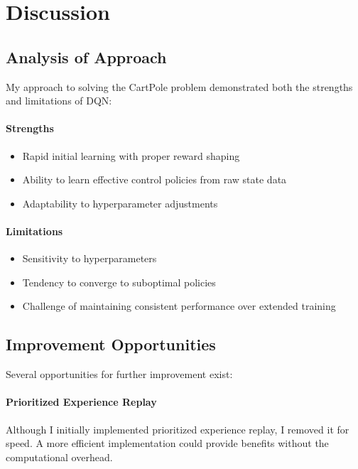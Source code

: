 \documentclass[11pt,a4paper]{article}
\begin{document}
\section{Discussion}

\subsection{Analysis of Approach}

My approach to solving the CartPole problem demonstrated both the strengths and limitations of DQN:

\paragraph{Strengths}
\begin{itemize}
    \item Rapid initial learning with proper reward shaping
    \item Ability to learn effective control policies from raw state data
    \item Adaptability to hyperparameter adjustments
\end{itemize}

\paragraph{Limitations}
\begin{itemize}
    \item Sensitivity to hyperparameters
    \item Tendency to converge to suboptimal policies
    \item Challenge of maintaining consistent performance over extended training
\end{itemize}

\subsection{Improvement Opportunities}

Several opportunities for further improvement exist:

\paragraph{Prioritized Experience Replay}
Although I initially implemented prioritized experience replay, I removed it for speed. A more efficient implementation could provide benefits without the computational overhead.
\end{document}

